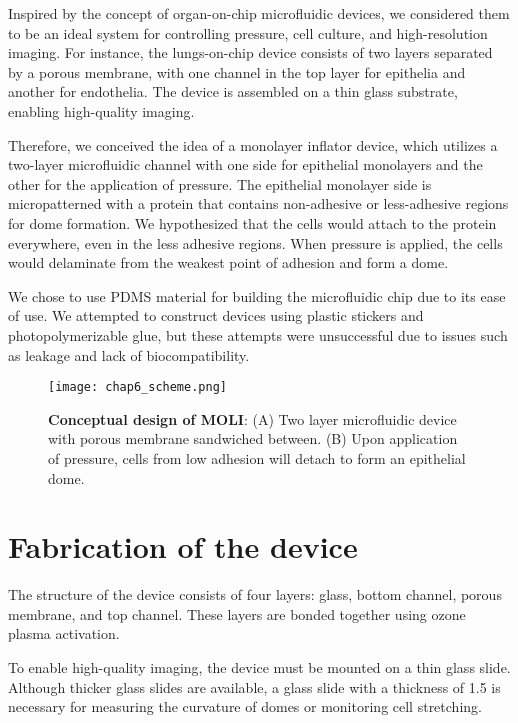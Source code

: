 Inspired by the concept of organ-on-chip microfluidic devices, we
considered them to be an ideal system for controlling pressure, cell
culture, and high-resolution imaging. For instance, the lungs-on-chip
device consists of two layers separated by a porous membrane, with one
channel in the top layer for epithelia and another for endothelia. The
device is assembled on a thin glass substrate, enabling high-quality
imaging.

Therefore, we conceived the idea of a monolayer inflator device, which
utilizes a two-layer microfluidic channel with one side for epithelial
monolayers and the other for the application of pressure. The epithelial
monolayer side is micropatterned with a protein that contains
non-adhesive or less-adhesive regions for dome formation. We
hypothesized that the cells would attach to the protein everywhere, even
in the less adhesive regions. When pressure is applied, the cells would
delaminate from the weakest point of adhesion and form a dome.

We chose to use PDMS material for building the microfluidic chip due to
its ease of use. We attempted to construct devices using plastic
stickers and photopolymerizable glue, but these attempts were
unsuccessful due to issues such as leakage and lack of biocompatibility.

\begin{figure}[h]
	\centering
	\texttt{[image: chap6\_scheme.png]}
	\caption{\textbf{Conceptual design of MOLI}: (A) Two layer microfluidic device with porous membrane sandwiched between. (B) Upon application of pressure, cells from low adhesion will detach to form an epithelial dome.
	}\label{fig_6_1}
\end{figure}


\hypertarget{fabrication-of-the-device}{%
\section{Fabrication of the device}\label{fabrication-of-the-device}}

The structure of the device consists of four layers: glass, bottom
channel, porous membrane, and top channel. These layers are bonded
together using ozone plasma activation.

To enable high-quality imaging, the device must be mounted on a thin
glass slide. Although thicker glass slides are available, a glass slide
with a thickness of 1.5 is necessary for measuring the curvature of
domes or monitoring cell stretching.


